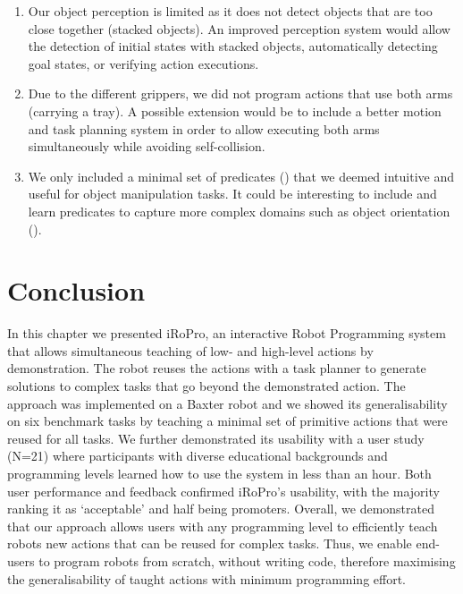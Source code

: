 \begin{enumerate}
	\item Our object perception is limited as it does not detect objects that are too close together (\eg stacked objects).
	An improved perception system would allow the detection of initial states with stacked objects, automatically detecting goal states, or verifying action executions.
	\item Due to the different grippers, we did not program actions that use both arms (\eg carrying a tray). A possible extension would be to include a better motion and task planning system in order to allow executing both arms simultaneously while avoiding self-collision.
	\item We only included a minimal set of predicates () that we deemed intuitive and useful for object manipulation tasks.
	It could be interesting to include and learn predicates to capture more complex domains such as object orientation (\cite{li2016learning}).
\end{enumerate}


\section{Conclusion} 
\label{sec:conclusion}
In this chapter we presented iRoPro, an interactive Robot Programming system that allows simultaneous teaching of low- and high-level actions by demonstration.
The robot reuses the actions with a task planner to generate solutions to complex tasks that go beyond the demonstrated action.
The approach was implemented on a Baxter robot and we showed its generalisability on six benchmark tasks by teaching a minimal set of primitive actions that were reused for all tasks.
We further demonstrated its usability with a user study (N=21) where participants with diverse educational backgrounds and programming levels learned how to use the system in less than an hour.
Both user performance and feedback confirmed iRoPro's usability, with the majority ranking it as `acceptable' and half being promoters.
Overall, we demonstrated that our approach allows users with any programming level to efficiently teach robots new actions that can be reused for complex tasks.
Thus, we enable end-users to program robots from scratch, without writing code, therefore maximising the generalisability of taught actions with minimum programming effort.
